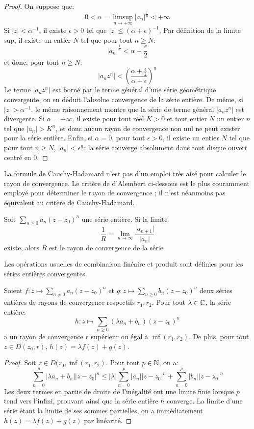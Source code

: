 \begin{proof}
On suppose que: 
\[
0 < \alpha = \limsup_{n \to +\infty} |a_n|^{\frac{1}{n}} <
+\infty
\]
Si $|z|<\alpha^{-1}$, il existe $\epsilon > 0$ tel que $|z|\leq
(\alpha+\epsilon)^{-1}$. Par définition de la limite sup, il existe un entier
$N$ tel que pour tout $n \geq N$:
\[
|a_n|^{\frac{1}{n}} < \alpha + \frac{\epsilon}{2}
\]
et donc, pour tout $n \geq N$:
\[
\left|a_nz^n\right|< \left(\frac{\alpha + \frac{\epsilon}{2}}{\alpha +
\epsilon}\right)^n
\]
Le terme $|a_nz^n|$ est borné par le terme général d'une série géométrique
convergente, on  en déduit l'absolue convergence de la série entière.
De même, si $|z|> \alpha^{-1}$, le même raisonnement montre que la série de terme général
$\left|a_nz^n\right|$ est divergente. Si $\alpha = +\infty$, il existe pour tout
réel $K>0$ et tout entier $N$ un entier $n$ tel que $|a_n|>K^n$, et donc aucun
rayon de convergence non nul ne peut exister pour la série entière. Enfin, si
$\alpha = 0$, pour tout $\epsilon > 0$, il existe un entier $N$ tel que pour
tout $n \geq N$, $|a_n|<\epsilon^n$: la série converge absolument dans tout
disque ouvert centré en 0.
\end{proof}
La formule de Cauchy-Hadamard n'est pas d'un emploi très aisé pour calculer le rayon de convergence. Le critère de d'Alembert ci-dessous est le plus couramment employé pour déterminer le rayon de
convergence ; il n'est néanmoins pas équivalent au critère de Cauchy-Hadamard.
\begin{fprop}
Soit $\sum_{n \geq 0}a_n (z-z_0)^n$ une série entière. Si la limite
\[\frac{1}{R} = \lim_{n \to \infty}\frac{\lvert a_{n+1}\rvert}{ \lvert a_{n} \rvert}
\]
existe, alors $R$ est le rayon de convergence de la série.
\end{fprop} 
Les opérations usuelles de combinaison linéaire et produit sont définies pour les séries entières convergentes.
\begin{fprop}
Soient $f \colon z \mapsto \sum_{n \neq 0}a_n(z-z_0)^n$ et $g \colon z \mapsto \sum_{n \geq 0} b_n (z-z_0)^n$ deux séries entières de rayons de convergence respectifs $r_1,r_2$. Pour tout $\lambda \in \mathbb{C}$, la série entière:
\[
h \colon z \mapsto \sum_{n \geq 0} (\lambda a_n + b_n) (z-z_0)^n
\]
a un rayon de convergence $r$ supérieur ou égal à $\inf(r_1,r_2)$. De plus, pour tout $z \in D(z_0,r), \, h(z) = \lambda f(z) + g(z)$.
\end{fprop}
\begin{proof}
Soit $z \in D(z_0, \inf(r_1,r_2)$. Pour tout $p \in {\mathbb N}$, on a:
\[
\sum_{n=0}^p \lvert \lambda a_n + b_n \lvert |z-z_0|^n \leq  \lvert \lambda\rvert  \sum_{n=0}^p \lvert a_n \lvert |z-z_0|^n + \sum_{n=0}^p \lvert b_n \lvert |z-z_0|^n 
\]
Les deux termes en partie de droite de l'inégalité ont une limite finie lorsque $p$ tend vers l'infini, prouvant ainsi que la série entière $h$ converge. La limite d'une série étant la limite de ses sommes partielles, on a immédiatement $h(z) = \lambda f(z) + g(z)$ par linéarité.
\end{proof}
